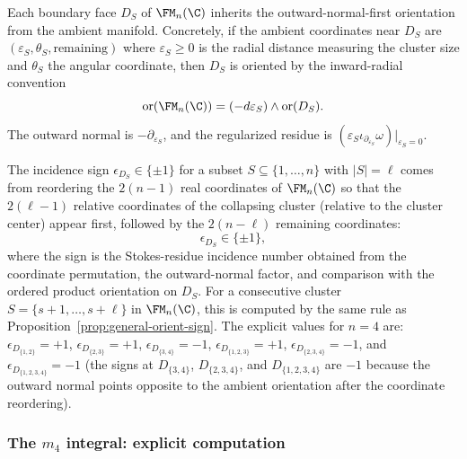 \begin{definition}%
Each boundary face $D_S$ of $\FM_n(\C)$ inherits the
outward-normal-first orientation from the ambient manifold.
Concretely, if the ambient coordinates near $D_S$ are
$(\varepsilon_S, \theta_S, \text{remaining})$ where
$\varepsilon_S \geq 0$ is the radial distance measuring the
cluster size and $\theta_S$ the angular coordinate, then $D_S$
is oriented by the inward-radial convention
\[
\operatorname{or}(\FM_n(\C))
=(-d\varepsilon_S)\wedge\operatorname{or}(D_S).
\]
The outward normal is \(-\partial_{\varepsilon_S}\), and the
regularized residue is
\((\varepsilon_S\iota_{\partial_{\varepsilon_S}}\omega)|_{\varepsilon_S=0}\).

The incidence sign \(\epsilon_{D_S}\in\{\pm1\}\) for a subset
$S \subseteq \{1,\ldots,n\}$ with $|S| = \ell$ comes
from reordering the $2(n-1)$ real coordinates of
$\FM_n(\C)$ so that the $2(\ell-1)$ relative coordinates
of the collapsing cluster (relative to the cluster center)
appear first, followed by the $2(n-\ell)$ remaining
coordinates:
\begin{equation}%
\epsilon_{D_S}\in\{\pm1\},
\end{equation}
where the sign is the Stokes-residue incidence number obtained from
the coordinate permutation, the outward-normal factor, and comparison
with the ordered product orientation on \(D_S\). For a consecutive cluster
$S = \{s{+}1, \ldots, s{+}\ell\}$ in $\FM_n(\C)$, this
is computed by the same rule as
Proposition~\ref{prop:general-orient-sign}. The explicit values for
\(n=4\) are:
\(\epsilon_{D_{\{1,2\}}}=+1\),
\(\epsilon_{D_{\{2,3\}}}=+1\),
\(\epsilon_{D_{\{3,4\}}}=-1\),
\(\epsilon_{D_{\{1,2,3\}}}=+1\),
\(\epsilon_{D_{\{2,3,4\}}}=-1\), and
\(\epsilon_{D_{\{1,2,3,4\}}}=-1\)
(the signs at $D_{\{3,4\}}$, $D_{\{2,3,4\}}$, and
$D_{\{1,2,3,4\}}$ are $-1$ because the outward normal
points opposite to the ambient orientation after
the coordinate reordering).
\end{definition}

\subsubsection{The $m_4$ integral: explicit computation}

